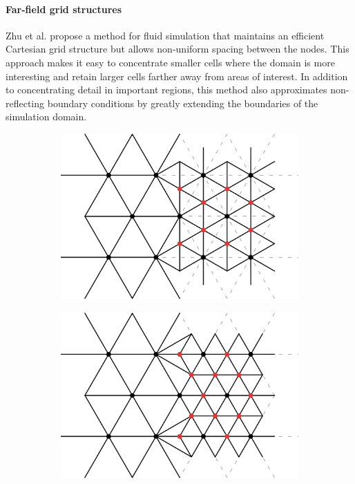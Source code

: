 \paragraph*{Far-field grid structures} Zhu et al. \cite{Zhu2013} propose a method for fluid simulation that maintains an efficient Cartesian grid structure but allows non-uniform spacing between the nodes.
This approach makes it easy to concentrate smaller cells where the domain is more interesting and retain larger cells farther away from areas of interest.
In addition to concentrating detail in important regions, this method also approximates non-reflecting boundary conditions by greatly extending the boundaries of the simulation domain.

\begin{figure}[t]
\centering
\begin{subfigure}[b]{0.2\linewidth}
\centering
\includegraphics[width=\linewidth,valign=m]{images/starAdaptivity-cgf2016/remeshing-sqrt3.png}
\caption{\label{fig:remeshing-sqrt3}}
\end{subfigure}
\hfill
\begin{subfigure}[b]{0.2\linewidth}
\centering
\includegraphics[width=\linewidth,valign=m]{images/starAdaptivity-cgf2016/remeshing-bisect.png}

\end{subfigure}
\end{figure}
